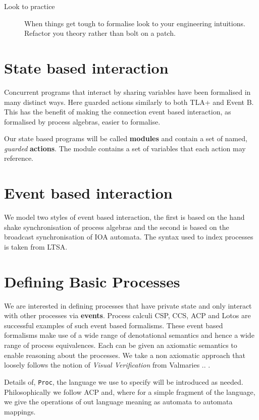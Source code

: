 \documentclass[]{article}
\begin{document}
{\begin{description}
\item[Look to practice]  When things get tough to formalise look to your engineering intuitions. Refactor you theory rather than bolt on a patch.
\end{description}

\section{State based interaction}
Concurrent programs that interact by sharing variables have been formalised in many distinct ways. Here guarded actions similarly to both TLA+  and Event B.  This has the benefit of making the  connection  event based interaction, as formalised by process algebras, easier to formalise.

Our state based programs will be called {\bf modules} and contain a set of named, \emph{guarded} {\bf actions}. The module contains a set of variables  that each action may reference.

\section{Event based interaction}
We model two styles of  event based interaction, the first  is based on the hand shake synchronisation of   process algebras and the second is based on the broadcast synchronisation of IOA automata. The syntax used to index processes is taken from LTSA.
}


\section{Defining Basic Processes}
We are interested in defining processes that have private state and only interact with other processes via {\bf events}. Process calculi CSP, CCS, ACP and  Lotos  are  successful examples of such event based formalisms.
These event based formalisms make use of a wide range of denotational semantics and hence  a wide range of process equivalences.  Each can be  given an axiomatic semantics to enable  reasoning about the processes. We take a non axiomatic  approach that loosely   follows the notion of \emph{Visual Verification}  from  Valmaries .. \cite{}.

Details of, \verb|Proc|,  the language we use to specify will be introduced as needed. Philosophically we follow ACP and, where for a simple fragment of the language, we give the operations of out language meaning as automata to automata mappings.
\end{document}
